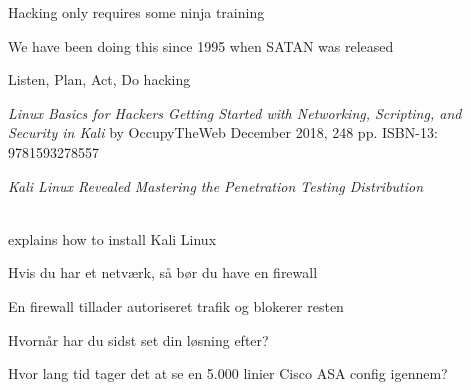 \documentclass[Screen16to9,17pt]{foils}
\begin{document}


\begin{list2}
\item Hacking only requires some ninja training
\item We have been doing this since 1995 when SATAN was released
\item Listen, Plan, Act, Do hacking
\end{list2}



\emph{Linux Basics for Hackers
Getting Started with Networking, Scripting, and Security in Kali}
by OccupyTheWeb
December 2018, 248 pp.
ISBN-13:
9781593278557




\emph{Kali Linux Revealed  Mastering the Penetration Testing Distribution}

\\
explains how to install Kali Linux



\begin{list2}
\item Hvis du har et netværk, så bør du have en firewall
\item En firewall tillader autoriseret trafik og blokerer resten
\item Hvornår har du sidst set din løsning efter?
\item Hvor lang tid tager det at se en 5.000 linier Cisco ASA config igennem?
\end{list2}


\end{document}
